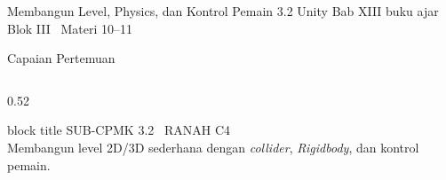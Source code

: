 \documentclass[aspectratio=169,10pt]{beamer}
\begin{document}
  {Membangun Level, Physics, dan Kontrol Pemain}
  {3.2}
  {Unity}
  {Bab XIII buku ajar}
  {Blok III \textperiodcentered\ Materi 10--11}

\begin{frame}{Capaian Pertemuan}
\begin{columns}[T,onlytextwidth]
  \begin{column}{0.52\textwidth}
    \begin{beamercolorbox}[wd=\linewidth,sep=5pt,rounded=true]{block title}
      {\fontsize{6.8}{8}\selectfont\color{ubHead}SUB-CPMK 3.2 \textperiodcentered\ RANAH C4}\\[2pt]
      {\footnotesize Membangun level 2D/3D sederhana dengan \emph{collider},
       \emph{Rigidbody}, dan kontrol pemain.}
    \end{beamercolorbox}
    \vspace{0.14cm}


\end{column}
\end{columns}
\end{frame}
\end{document}
